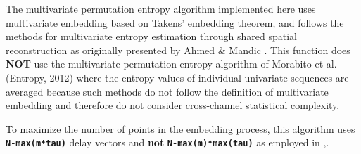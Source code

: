 \documentclass[12pt, a4paper, titlepage, openany]{book}
\begin{document}
 
\begin{tcolorbox}[colback=ehone!5, colframe=ehone!, title=\hypertarget{bidinote}{\textbf{IMPORTANT}}, label={BiBox}]
The multivariate permutation entropy algorithm implemented here uses multivariate embedding based on Takens’ embedding theorem, and follows the methods for multivariate entropy estimation through shared spatial reconstruction as originally presented by Ahmed \& Mandic \cite{MvSamp1} \cite{MvSamp2}.
\newline
This function does \textbf{NOT} use the multivariate permutation entropy algorithm of Morabito et al. (Entropy, 2012) where the entropy values of individual univariate sequences are averaged because such methods do not follow the definition of multivariate embedding and therefore do not consider cross-channel statistical complexity.
\end{tcolorbox} 

\begin{tcolorbox}[colback=ehone!5, colframe=ehtwo!, title=\hypertarget{bidinote}{\textbf{NOTE}}, label={BiBox}]
To maximize the number of points in the embedding process, this algorithm uses \texttt{\textbf{N-max(m*tau)}} delay vectors and \textbf{not} \texttt{\textbf{N-max(m)*max(tau)}} as employed in \cite{MvSamp2},\cite{MvSamp1}.
\end{tcolorbox} 
\end{document}
